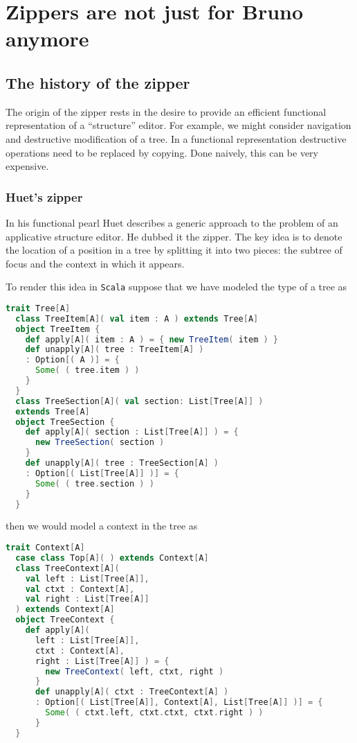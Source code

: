 \section{Zippers are not just for Bruno anymore}

\subsection{The history of the zipper}

The origin of the zipper rests in the desire to provide an efficient
functional representation of a ``structure'' editor. For example, we
might consider navigation and destructive modification of a tree. In a
functional representation destructive operations need to be replaced
by copying. Done naively, this can be very expensive.

\subsubsection{Huet's zipper}

In his functional pearl Huet describes a generic approach to the
problem of an applicative structure editor. He dubbed it the
zipper. The key idea is to denote the location of a position in a tree
by splitting it into two pieces: the subtree of focus and the context
in which it appears.

To render this idea in \texttt{Scala} suppose that we have modeled the
type of a tree as

\begin{lstlisting}[language=Scala,mathescape=true]
  trait Tree[A]
  class TreeItem[A]( val item : A ) extends Tree[A]
  object TreeItem {
    def apply[A]( item : A ) = { new TreeItem( item ) }
    def unapply[A]( tree : TreeItem[A] )
    : Option[( A )] = {
      Some( ( tree.item ) )
    }
  }
  class TreeSection[A]( val section: List[Tree[A]] )
  extends Tree[A]
  object TreeSection {
    def apply[A]( section : List[Tree[A]] ) = {
      new TreeSection( section )
    }
    def unapply[A]( tree : TreeSection[A] )
    : Option[( List[Tree[A]] )] = {
      Some( ( tree.section ) )
    }
  }
\end{lstlisting}

then we would model a context in the tree as

\begin{lstlisting}[language=Scala,mathescape=true]
  trait Context[A]
  case class Top[A]( ) extends Context[A]
  class TreeContext[A](
    val left : List[Tree[A]],
    val ctxt : Context[A],
    val right : List[Tree[A]]
  ) extends Context[A]
  object TreeContext {
    def apply[A](
      left : List[Tree[A]],
      ctxt : Context[A],
      right : List[Tree[A]] ) = {
        new TreeContext( left, ctxt, right )
      }
      def unapply[A]( ctxt : TreeContext[A] )
      : Option[( List[Tree[A]], Context[A], List[Tree[A]] )] = {
        Some( ( ctxt.left, ctxt.ctxt, ctxt.right ) )
      }
  }
\end{lstlisting}

